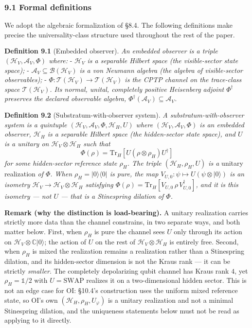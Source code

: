\documentclass[
]{article}
\begin{document}
\hypertarget{formal-definitions}{%
\subsubsection{9.1 Formal definitions}\label{formal-definitions}}

We adopt the algebraic formalization of §8.4. The following definitions
make precise the universality-class structure used throughout the rest
of the paper.

\textbf{Definition 9.1} (Embedded observer). \emph{An embedded observer
is a triple \((\mathcal{H}_V, \mathcal{A}_V, \Phi)\) where:} -
\emph{\(\mathcal{H}_V\) is a separable Hilbert space (the visible-sector
state space);} -
\emph{\(\mathcal{A}_V \subseteq \mathcal{B}(\mathcal{H}_V)\) is a von
Neumann algebra (the algebra of visible-sector observables);} -
\emph{\(\Phi:\mathcal T(\mathcal H_V)\to\mathcal T(\mathcal H_V)\) is
the CPTP channel on the trace-class space \(\mathcal T(\mathcal H_V)\).
Its normal, unital, completely positive Heisenberg adjoint
\(\Phi^\dagger\) preserves the declared observable algebra,
\(\Phi^\dagger(\mathcal A_V)\subseteq\mathcal A_V\).}

\textbf{Definition 9.2} (Substratum-with-observer system). \emph{A
substratum-with-observer system is a quintuple
\((\mathcal{H}_V, \mathcal{A}_V, \Phi, \mathcal{H}_H, U)\) where
\((\mathcal{H}_V, \mathcal{A}_V, \Phi)\) is an embedded observer,
\(\mathcal{H}_H\) is a separable Hilbert space (the hidden-sector state
space), and \(U\) is a unitary on
\(\mathcal{H}_V \otimes \mathcal{H}_H\) such that}
\[\Phi(\rho) = \mathrm{Tr}_H[U(\rho \otimes \rho_H) U^\dagger]\]
\emph{for some hidden-sector reference state \(\rho_H\). The triple
\((\mathcal{H}_H, \rho_H, U)\) is a} unitary realization \emph{of
\(\Phi\). When \(\rho_H = |0\rangle\langle 0|\) is pure, the map
\(V_{U,0}: \psi \mapsto U(\psi \otimes |0\rangle)\) is an isometry
\(\mathcal{H}_V \to \mathcal{H}_V \otimes \mathcal{H}_H\) satisfying
\(\Phi(\rho) = \mathrm{Tr}_H[V_{U,0}\, \rho\, V_{U,0}^\dagger]\), and it
is this isometry --- not \(U\) --- that is a Stinespring dilation of
\(\Phi\).}

\textbf{Remark (why the distinction is load-bearing).} A unitary
realization carries strictly more data than the channel constrains, in
two separate ways, and both matter below. First, when \(\rho_H\) is pure
the channel sees \(U\) only through its action on
\(\mathcal{H}_V \otimes \mathbb{C}|0\rangle\); the action of \(U\) on
the rest of \(\mathcal{H}_V \otimes \mathcal{H}_H\) is entirely free.
Second, when \(\rho_H\) is mixed the realization remains a realization
rather than a Stinespring dilation, and its hidden-sector dimension is
not the Kraus rank --- it can be strictly \emph{smaller}. The completely
depolarizing qubit channel has Kraus rank \(4\), yet
\(\rho_H = \mathbb{1}/2\) with \(U = \mathrm{SWAP}\) realizes it on a
two-dimensional hidden sector. This is not an edge case for OI: §10.4's
construction uses the uniform mixed reference state, so OI's own
\((\mathcal{H}_H, \rho_H, U_\varphi)\) is a unitary realization and not
a minimal Stinespring dilation, and the uniqueness statements below must
not be read as applying to it directly.
\end{document}
